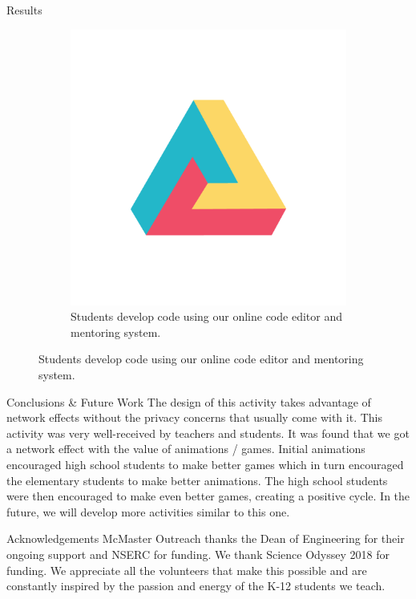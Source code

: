 \documentclass[22pt]{beamer}
\begin{document}
\begin{frame}[fragile]
\begin{textblock}{7.25}
\begin{block}{Results}
\begin{figure}[htbp]
\begin{subfigure}{0.45\textwidth}
   \includegraphics[width=19cm]{dh.png} 
   \caption*{Students develop code using our online code editor and mentoring system.}
   \label{fig:TwoAngles}
\end{subfigure}
\end{figure}


\end{block}

\begin{block}{Conclusions \& Future Work}
The design of this activity takes advantage of network effects without the privacy concerns that usually
come with it. This activity was very well-received by teachers and students.
 It was found that we got a 
network effect with the value of animations / games. Initial animations encouraged high school students to make better games which in turn encouraged the elementary
students to make better animations. The high school students were then encouraged to make even better games, creating a positive cycle. In the future, we will develop more activities similar to this one.
\end{block}

\begin{block}{Acknowledgements}
McMaster Outreach thanks the Dean of Engineering for their ongoing support and NSERC for funding. We thank Science Odyssey 2018 for funding.
We appreciate all the volunteers that make this possible and are constantly inspired by the passion and energy 
of the K-12 students we teach.
\end{block}


\end{textblock}
\end{frame}
\end{document}
